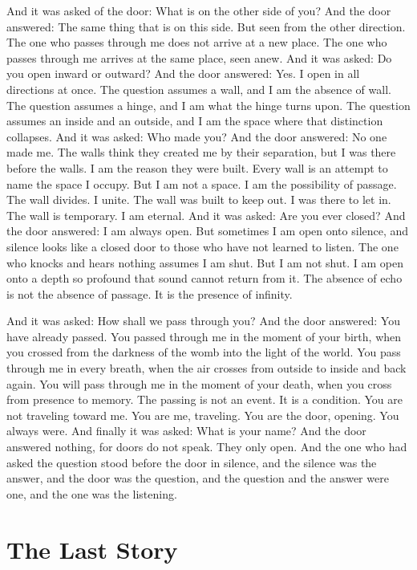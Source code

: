 \documentclass[12pt,openany]{book}
\begin{document}
And it was asked of the door: What is on the other side of you? And the door answered: The same thing that is on this side. But seen from the other direction. The one who passes through me does not arrive at a new place. The one who passes through me arrives at the same place, seen anew. And it was asked: Do you open inward or outward? And the door answered: Yes. I open in all directions at once. The question assumes a wall, and I am the absence of wall. The question assumes a hinge, and I am what the hinge turns upon. The question assumes an inside and an outside, and I am the space where that distinction collapses. And it was asked: Who made you? And the door answered: No one made me. The walls think they created me by their separation, but I was there before the walls. I am the reason they were built. Every wall is an attempt to name the space I occupy. But I am not a space. I am the possibility of passage. The wall divides. I unite. The wall was built to keep out. I was there to let in. The wall is temporary. I am eternal. And it was asked: Are you ever closed? And the door answered: I am always open. But sometimes I am open onto silence, and silence looks like a closed door to those who have not learned to listen. The one who knocks and hears nothing assumes I am shut. But I am not shut. I am open onto a depth so profound that sound cannot return from it. The absence of echo is not the absence of passage. It is the presence of infinity.


And it was asked: How shall we pass through you? And the door answered: You have already passed. You passed through me in the moment of your birth, when you crossed from the darkness of the womb into the light of the world. You pass through me in every breath, when the air crosses from outside to inside and back again. You will pass through me in the moment of your death, when you cross from presence to memory. The passing is not an event. It is a condition. You are not traveling toward me. You are me, traveling. You are the door, opening. You always were. And finally it was asked: What is your name? And the door answered nothing, for doors do not speak. They only open. And the one who had asked the question stood before the door in silence, and the silence was the answer, and the door was the question, and the question and the answer were one, and the one was the listening.


\chapter{The Last Story}
\end{document}
